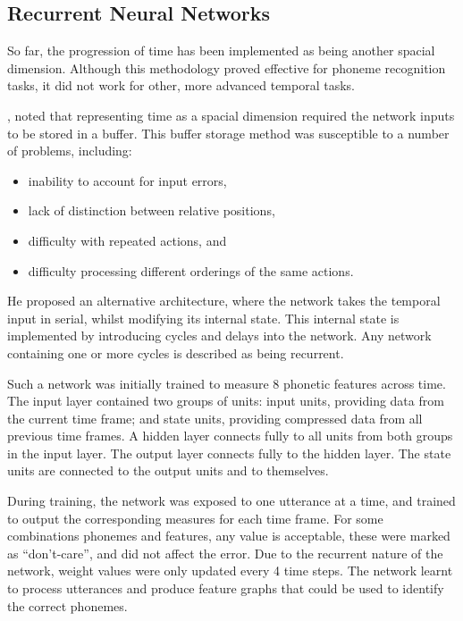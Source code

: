 \subsection{Recurrent Neural Networks}

So far, the progression of time has been implemented as being another spacial
dimension.
Although this methodology proved effective for phoneme recognition tasks, it did
not work for other, more advanced temporal tasks.



\cite{Jordan:1986:Serial}, noted that representing time as a spacial dimension
required the network inputs to be stored in a buffer.
This buffer storage method was susceptible to a number of problems, including:
\begin{itemize}
    \item inability to account for input errors,
    \item lack of distinction between relative positions,
    \item difficulty with repeated actions, and
    \item difficulty processing different orderings of the same actions.
\end{itemize}
He proposed an alternative architecture, where the network takes the temporal
input in serial, whilst modifying its internal state.
This internal state is implemented by introducing cycles and delays into the
network.
Any network containing one or more cycles is described as being recurrent.

Such a network was initially trained to measure 8 phonetic features across time.
The input layer contained two groups of units:
input units, providing data from the current time frame;
and state units, providing compressed data from all previous time frames.
A hidden layer connects fully to all units from both groups in the input layer.
The output layer connects fully to the hidden layer.
The state units are connected to the output units and to themselves.
\begin{center}
    
\end{center}
During training, the network was exposed to one utterance at a time, and trained
to output the corresponding measures for each time frame.
For some combinations phonemes and features, any value is acceptable, these were
marked as ``don't-care'', and did not affect the error.
Due to the recurrent nature of the network, weight values were only updated
every 4 time steps.
The network learnt to process utterances and produce feature graphs that could
be used to identify the correct phonemes.



